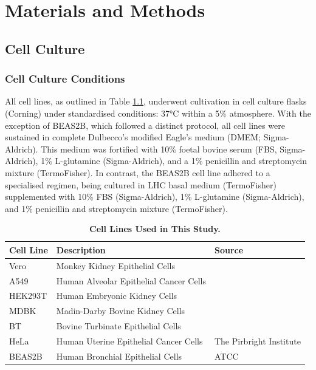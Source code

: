 \chapter{Materials and Methods} \label{ch:Materials and Methods}
\section{Cell Culture} \label{sec:Cell Culture}
\subsection{Cell Culture Conditions} \label{subsec:Cell Culture Conditions}
All cell lines, as outlined in Table \ref{tab:Cell Lines Table}, underwent cultivation in cell culture flasks (Corning) under standardised conditions: 37°C within a 5\%  atmosphere. With the exception of BEAS2B, which followed a distinct protocol, all cell lines were sustained in complete Dulbecco’s modified Eagle's medium (DMEM; Sigma-Aldrich). This medium was fortified with 10\% foetal bovine serum (FBS, Sigma-Aldrich), 1\% L-glutamine (Sigma-Aldrich), and a 1\% penicillin and streptomycin mixture (TermoFisher). In contrast, the BEAS2B cell line adhered to a specialised regimen, being cultured in LHC basal medium (TermoFisher) supplemented with 10\% FBS (Sigma-Aldrich), 1\% L-glutamine (Sigma-Aldrich), and 1\% penicillin and streptomycin mixture (TermoFisher).

\begin{table}
  \centering
  \begin{tabular}{lll}
    \toprule
    {\textbf{Cell Line}} &
  {\textbf{Description}} &
  {\textbf{Source}} \\ \midrule
    Vero & Monkey Kidney Epithelial Cells & \\ 
    A549 & Human Alveolar Epithelial Cancer Cells &   \\
    HEK293T & Human Embryonic Kidney Cells &  \\ 
    MDBK & Madin-Darby Bovine Kidney Cells &  \\
    BT & Bovine Turbinate Epithelial Cells &  \\
    HeLa & Human Uterine Epithelial Cancer Cells &
    \multirow{-6}{*}{The Pirbright Institute}
    \\
    BEAS2B & Human Bronchial Epithelial Cells & ATCC  \\ \bottomrule
  \end{tabular}
  \caption[Cell Lines Used in This Study.]{\textbf{Cell Lines Used in This Study.}}
  \label{tab:Cell Lines Table}
\end{table}

